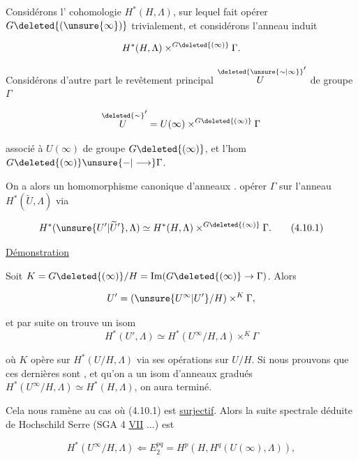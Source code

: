 
 Considérons l' cohomologie $H^*(H,\Lambda)$, sur lequel  fait opérer $G\deleted{(\unsure{\infty})}$ trivialement, et considérons l'anneau induit

\[
H^*(H,\Lambda)\mathbin{\times^{G\deleted{(\infty)}}}\Gamma.
\]

 Considérons d'autre part le revêtement principal $\overset{\deleted{\unsure{\sim|\infty}}}{U}'$ de groupe $\Gamma$

\[
\overset{\deleted{\sim}}{U}'=U(\infty)\mathbin{\times^{G\deleted{(\infty)}}}\Gamma
\]

associé à $U(\infty)$ de groupe $G\deleted{(\infty)}$, et l'hom $G\deleted{(\infty)}\unsure{{-}|\longrightarrow}\Gamma$.

On a alors un homomorphisme canonique d'anneaux .  opérer $\Gamma$ sur l'anneau $H^*(\widetilde U,\Lambda)$ via 

\[
H^*(\unsure{U'|\widetilde U'},\Lambda)\simeq H^*(H,\Lambda)\mathbin{\times^{G\deleted{(\infty)}}}\Gamma.
\tag*{(4.10.1)}
\]


\uline{Démonstration} 

Soit $K=G\deleted{(\infty)}/H=\operatorname{Im}(G\deleted{(\infty)}\to\Gamma)$. Alors

\[
U'=(\unsure{U^\infty|U'}/H)\mathbin{\times^K}\Gamma,
\]

et par suite on trouve un isom 
\[
H^*(U',\Lambda)\simeq H^*(U^\infty/H,\Lambda)\mathbin{\times^K}\Gamma
\]

où $K$ opère sur $H^*(U/H,\Lambda)$ via ses opérations sur $U/H$. Si nous prouvons que ces dernières sont ,  et qu'on a un isom d'anneaux gradués $H^*(U^\infty/H,\Lambda)\simeq H^*(H,\Lambda)$, on aura terminé.

Cela nous ramène au cas où (4.10.1) est \uline{surjectif}. Alors la suite spectrale déduite de Hochschild Serre (SGA 4 \uline{VII} $\ldots$) est

\[
H^*(U^\infty/H,\Lambda)\Longleftarrow E_2^{pq}=H^p(H,H^q(U(\infty),\Lambda)),
\]

